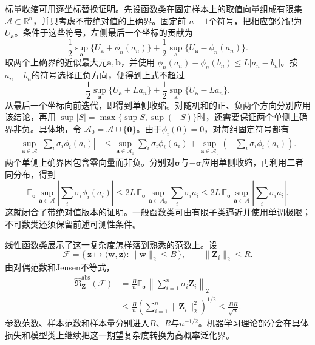 标量收缩可用逐坐标替换证明。先设函数类在固定样本上的取值向量组成有限集
\(\mathcal{A}\subset\mathbb{R}^n\)，并只考虑不带绝对值的上确界。固定前
\(n-1\)个符号，把相应部分记为\(U_{\bm{a}}\)。条件于这些符号，左侧最后一个坐标的贡献为
\[
  \frac12\sup_{\bm{a}}\{U_{\bm{a}}+\phi_n(a_n)\}
  +\frac12\sup_{\bm{a}}\{U_{\bm{a}}-\phi_n(a_n)\}.
\]
取两个上确界的近似最大元\(\bm{a},\bm{b}\)，并使用
\(\phi_n(a_n)-\phi_n(b_n)\leq L|a_n-b_n|\)。按
\(a_n-b_n\)的符号选择正负方向，便得到上式不超过
\[
  \frac12\sup_{\bm{a}}\{U_{\bm{a}}+La_n\}
  +\frac12\sup_{\bm{a}}\{U_{\bm{a}}-La_n\}.
\]
从最后一个坐标向前迭代，即得到单侧收缩。对随机和的正、负两个方向分别应用该结论，再用
\(\sup|S|=\max\{\sup S,\sup(-S)\}\)时，还需要保证两个单侧上确界非负。具体地，令
\(\mathcal{A}_0=\mathcal{A}\cup\{\bm{0}\}\)。由于\(\phi_i(0)=0\)，对每组固定符号都有
\[
\begin{aligned}
  \sup_{\bm{a}\in\mathcal{A}}
  \left|\sum_i\sigma_i\phi_i(a_i)\right|
  &\leq
  \sup_{\bm{a}\in\mathcal{A}_0}
  \sum_i\sigma_i\phi_i(a_i)
  +
  \sup_{\bm{a}\in\mathcal{A}_0}
  \left(-\sum_i\sigma_i\phi_i(a_i)\right).
\end{aligned}
\]
两个单侧上确界因包含零向量而非负。分别对\(\bm{\sigma}\)与\(-\bm{\sigma}\)应用单侧收缩，再利用二者同分布，得到
\[
  \mathbb{E}_{\bm{\sigma}}
  \sup_{\bm{a}\in\mathcal{A}}
  \left|\sum_i\sigma_i\phi_i(a_i)\right|
  \leq
  2L\,
  \mathbb{E}_{\bm{\sigma}}
  \sup_{\bm{a}\in\mathcal{A}_0}
  \sum_i\sigma_i a_i
  \leq
  2L\,
  \mathbb{E}_{\bm{\sigma}}
  \sup_{\bm{a}\in\mathcal{A}}
  \left|\sum_i\sigma_i a_i\right|.
\]
这就闭合了带绝对值版本的证明。一般函数类可由有限子类逼近并使用单调极限；不可数类还须保留前述可测性条件。

线性函数类展示了这一复杂度怎样落到熟悉的范数上。设
\[
  \mathcal{F}
  =\{\,\bm{z}\mapsto\langle\bm{w},\bm{z}\rangle:
       \lVert\bm{w}\rVert_2\leq B\,\},
  \qquad \lVert\bm{Z}_i\rVert_2\leq R.
\]
由对偶范数和Jensen不等式，
\[
\begin{aligned}
  \widehat{\mathfrak{R}}_{\bm{Z}}^{\mathrm{abs}}(\mathcal{F})
  &=
  \frac{B}{n}\mathbb{E}_{\bm{\sigma}}
  \left\lVert\sum_{i=1}^{n}\sigma_i\bm{Z}_i\right\rVert_2\\
  &\leq
  \frac{B}{n}
  \left(\sum_{i=1}^{n}\lVert\bm{Z}_i\rVert_2^2\right)^{1/2}
  \leq\frac{BR}{\sqrt n}.
\end{aligned}
\]
参数范数、样本范数和样本量分别进入\(B\)、\(R\)与\(n^{-1/2}\)。机器学习理论部分会在具体损失和模型类上继续把这一期望复杂度转换为高概率泛化界。

